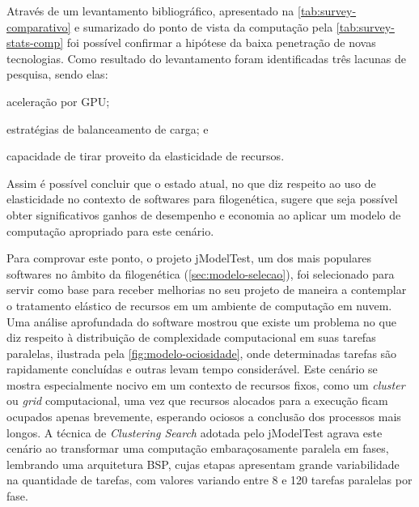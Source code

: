 \documentclass[english,brazilian]{UNISINOSmonografia} %
\begin{document}
Através de um levantamento bibliográfico, apresentado na \autoref{tab:survey-comparativo} e sumarizado do ponto de vista da computação pela \autoref{tab:survey-stats-comp} foi possível confirmar a hipótese da baixa penetração de novas tecnologias.
Como resultado do levantamento foram identificadas três lacunas de pesquisa, sendo elas:
\begin{inparaenum}[\itshape 1\upshape)] 
	\item aceleração por GPU;
	\item estratégias de balanceamento de carga; e
	\item capacidade de tirar proveito da elasticidade de recursos.
\end{inparaenum}
Assim é possível concluir que o estado atual, no que diz respeito ao uso de elasticidade no contexto de softwares para filogenética, sugere que seja possível obter significativos ganhos de desempenho e economia ao aplicar um modelo de computação apropriado para este cenário.


Para comprovar este ponto, o projeto jModelTest, um dos mais populares softwares no âmbito da filogenética (\autoref{sec:modelo-selecao}), foi selecionado para servir como base para receber melhorias no seu projeto de maneira a contemplar o tratamento elástico de recursos em um ambiente de computação em nuvem.
Uma análise aprofundada do software mostrou que existe um problema no que diz respeito à distribuição de complexidade computacional em suas tarefas paralelas, ilustrada pela \autoref{fig:modelo-ociosidade}, onde determinadas tarefas são rapidamente concluídas e outras levam tempo considerável.
Este cenário se mostra especialmente nocivo em um contexto de recursos fixos, como um \textit{cluster} ou \textit{grid} computacional, uma vez que recursos alocados para a execução ficam ocupados apenas brevemente, esperando ociosos a conclusão dos processos mais longos.
A técnica de \textit{Clustering Search} adotada pelo jModelTest agrava este cenário ao transformar uma computação embaraçosamente paralela em fases, lembrando uma arquitetura BSP, cujas etapas apresentam grande variabilidade na quantidade de tarefas, com valores variando entre 8 e 120 tarefas paralelas por fase.
\end{document}
